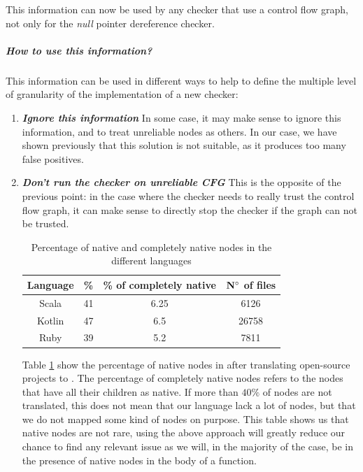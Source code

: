 This information can now be used by any checker that use a control flow graph, not only for the \emph{null} pointer dereference checker.

\subparagraph{How to use this information?}
\label{subsubsec:use_unreliable_information}

This information can be used in different ways to help to define the multiple level of granularity of the implementation of a new checker:

\begin{enumerate}
\item \textbf{\textit{Ignore this information}} \newline
In some case, it may make sense to ignore this information, and to treat unreliable nodes as others. 
In our case, we have shown previously that this solution is not suitable, as it produces too many false positives. \newline

\item \textbf{\textit{Don’t run the checker on unreliable CFG}} \newline
This is the opposite of the previous point: in the case where the checker needs to really trust the control flow graph, it can make sense to directly stop the checker if the graph can not be trusted.

\begin{table}[h]
	\centering
	\caption{Percentage of native and completely native nodes in the different languages}
	\label{table:slang-native-percentage}
	\begin{tabular}{|c|c|c|c|}
		\hline
		\bf Language & \bf \% & \bf \% of completely native & \bf $\bf N^{\circ}$  of files \\ \hline
		Scala &  41 &  6.25 & 6126 \\ 
		Kotlin &  47 &  6.5 & 26758 \\ 
		Ruby &  39 &  5.2 &  7811 \\ \hline
	\end{tabular}
\end{table}

Table \ref{table:slang-native-percentage} show the percentage of native nodes in \slang{} after translating open-source projects \cite{SlangSources:2019:Online} to \slang{}. The percentage of completely native nodes refers to the nodes that have all their children as native. If more than $40\%$ of nodes are not translated, this does not mean that our language lack a lot of nodes, but that we do not mapped some kind of nodes on purpose.
This table shows us that native nodes are not rare, using the above approach will greatly reduce our chance to find any relevant issue as we will, in the majority of the case, be in the presence of native nodes in the body of a function.


\end{enumerate}

